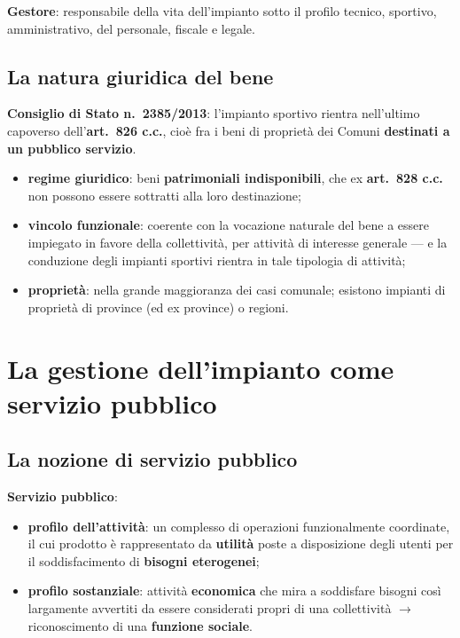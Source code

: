 \textbf{Gestore}: responsabile della vita dell'impianto sotto il profilo tecnico, sportivo,
amministrativo, del personale, fiscale e legale.

\subsection{La natura giuridica del bene}

\textbf{Consiglio di Stato n.\ 2385/2013}: l'impianto sportivo rientra nell'ultimo capoverso
dell'\textbf{art.\ 826 c.c.}, cioè fra i beni di proprietà dei Comuni \textbf{destinati a un
pubblico servizio}.

\begin{itemize}
  \item \textbf{regime giuridico}: beni \textbf{patrimoniali indisponibili}, che ex \textbf{art.\
    828 c.c.} non possono essere sottratti alla loro destinazione;
  \item \textbf{vincolo funzionale}: coerente con la vocazione naturale del bene a essere
    impiegato in favore della collettività, per attività di interesse generale --- e la conduzione
    degli impianti sportivi rientra in tale tipologia di attività;
  \item \textbf{proprietà}: nella grande maggioranza dei casi comunale; esistono impianti di
    proprietà di province (ed ex province) o regioni.
\end{itemize}

\section{La gestione dell'impianto come servizio pubblico}

\subsection{La nozione di servizio pubblico}

\textbf{Servizio pubblico}:
\begin{itemize}
  \item \textbf{profilo dell'attività}: un complesso di operazioni funzionalmente coordinate, il
    cui prodotto è rappresentato da \textbf{utilità} poste a disposizione degli utenti per il
    soddisfacimento di \textbf{bisogni eterogenei};
  \item \textbf{profilo sostanziale}: attività \textbf{economica} che mira a soddisfare bisogni
    così largamente avvertiti da essere considerati propri di una collettività $\rightarrow$
    riconoscimento di una \textbf{funzione sociale}.
\end{itemize}

